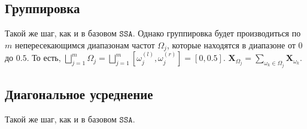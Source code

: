 \documentclass[12pt, specialist, subf
]{disser}
\theoremstyle{definition}
\newcommand{\SSA}{\texttt{SSA}}
\begin{document}
\subsection*{Группировка}
Такой же шаг, как и в базовом $\SSA$. Однако группировка будет производиться по $m$ непересекающимся диапазонам частот $\Omega_j$, которые находятся в диапазоне от $0$ до $0.5$. То есть,
$\bigsqcup \limits_{j=1}^m \Omega_j =
			      \bigsqcup \limits_{j=1}^m
			      \left[ \omega_j^{(l)}, \omega_j^{(r)} \right] =
			      [0, 0.5]$. $\mathbf X_{\Omega_j} =\sum\limits_{\omega_k \in \Omega_j} \mathbf{X}_{\omega_k}$.


\subsection*{Диагональное усреднение}
Такой же шаг, как и в базовом $\SSA$.
\end{document}
